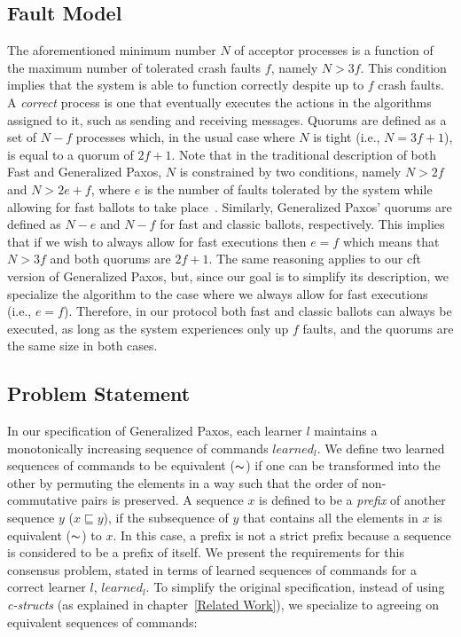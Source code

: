 \subsection{Fault Model}
The aforementioned minimum number $N$ of acceptor processes is a function of the maximum number of tolerated crash faults $f$, namely $N > 3f$. This condition implies that the system is able to function correctly despite up to $f$ crash faults. A \textit{correct} process is one that eventually executes the actions in the algorithms assigned to it, such as sending and receiving messages. Quorums are defined as a set of $N-f$ processes which, in the usual case where $N$ is tight (i.e., $N=3f+1$), is equal to a quorum of $2f+1$. Note that in the traditional description of both Fast and Generalized Paxos, $N$ is constrained by two conditions, namely $N>2f$ and $N>2e+f$, where $e$ is the number of faults tolerated by the system while allowing for fast ballots to take place~\cite{Lamport2006,Lamport2005}. Similarly, Generalized Paxos' quorums are defined as $N-e$ and $N-f$ for fast and classic ballots, respectively. This implies that if we wish to always allow for fast executions then $e=f$ which means that $N>3f$ and both quorums are $2f+1$. The same reasoning applies to our \acrshort{cft} version of Generalized Paxos, but, since our goal is to simplify its description, we specialize the algorithm to the case where we always allow for fast executions (i.e., $e=f$). Therefore, in our protocol both fast and classic ballots can always be executed, as long as the system experiences only up $f$ faults, and the quorums are the same size in both cases.

\subsection{Problem Statement} \label{cft_problem}
In our specification of Generalized Paxos, each learner $l$ maintains a monotonically increasing sequence of commands $learned_l$. We define two learned sequences of commands to be equivalent ($\thicksim$) if one can be transformed into the other by permuting the elements in a way such that the order of non-commutative pairs is preserved. A sequence $x$ is defined to be a \textit{prefix} of another sequence $y$ ($x \sqsubseteq y$), if the subsequence of $y$ that contains all the elements in $x$ is equivalent ($\thicksim$) to $x$. In this case, a prefix is not a strict prefix because a sequence is considered to be a prefix of itself. We present the requirements for this consensus problem, stated in terms of learned sequences of commands for a correct learner $l$, $learned_l$. To simplify the original specification, instead of using \textit{c-structs} (as explained in chapter~\ref{Related Work}), we specialize to agreeing on equivalent sequences of commands:

